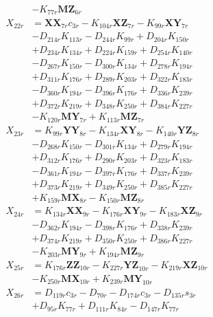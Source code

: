 \begin{multicols}{2}
\begin{align}
&- K_{77r}\mathbf{MZ}_{6r} \nonumber \\
X_{22r} &= \mathbf{XX}_{7r}c_{3r} - K_{104r}\mathbf{XZ}_{7r} - K_{99r}\mathbf{XY}_{7r}  \nonumber \\
&- D_{214r}K_{113r} - D_{244r}K_{99r} + D_{204r}K_{150r}  \nonumber \\
&+ D_{234r}K_{134r} + D_{224r}K_{159r} + D_{254r}K_{140r}  \nonumber \\
&- D_{267r}K_{150r} - D_{300r}K_{134r} + D_{278r}K_{194r}  \nonumber \\
&+ D_{311r}K_{176r} + D_{289r}K_{203r} + D_{322r}K_{183r}  \nonumber \\
&- D_{360r}K_{194r} - D_{396r}K_{176r} + D_{336r}K_{239r}  \nonumber \\
&+ D_{372r}K_{219r} + D_{348r}K_{250r} + D_{384r}K_{227r}  \nonumber \\
&- K_{120r}\mathbf{MY}_{7r} + K_{113r}\mathbf{MZ}_{7r} \nonumber \\
X_{23r} &= K_{99r}\mathbf{YY}_{8r} - K_{134r}\mathbf{XY}_{8r} - K_{140r}\mathbf{YZ}_{8r}  \nonumber \\
&- D_{268r}K_{150r} - D_{301r}K_{134r} + D_{279r}K_{194r}  \nonumber \\
&+ D_{312r}K_{176r} + D_{290r}K_{203r} + D_{323r}K_{183r}  \nonumber \\
&- D_{361r}K_{194r} - D_{397r}K_{176r} + D_{337r}K_{239r}  \nonumber \\
&+ D_{373r}K_{219r} + D_{349r}K_{250r} + D_{385r}K_{227r}  \nonumber \\
&+ K_{159r}\mathbf{MX}_{8r} - K_{150r}\mathbf{MZ}_{8r} \nonumber \\
X_{24r} &= K_{134r}\mathbf{XX}_{9r} - K_{176r}\mathbf{XY}_{9r} - K_{183r}\mathbf{XZ}_{9r}  \nonumber \\
&- D_{362r}K_{194r} - D_{398r}K_{176r} + D_{338r}K_{239r}  \nonumber \\
&+ D_{374r}K_{219r} + D_{350r}K_{250r} + D_{386r}K_{227r}  \nonumber \\
&- K_{203r}\mathbf{MY}_{9r} + K_{194r}\mathbf{MZ}_{9r} \nonumber \\
X_{25r} &= K_{176r}\mathbf{ZZ}_{10r} - K_{227r}\mathbf{YZ}_{10r} - K_{219r}\mathbf{XZ}_{10r}  \nonumber \\
&- K_{250r}\mathbf{MX}_{10r} + K_{239r}\mathbf{MY}_{10r} \nonumber \\
X_{26r} &= D_{119r}c_{3r} - D_{70r} - D_{174r}c_{3r} - D_{135r}s_{3r}  \nonumber \\
&+ D_{95r}K_{77r} + D_{111r}K_{84r} - D_{147r}K_{77r}  \nonumber \\

\end{align}
\end{multicols}
